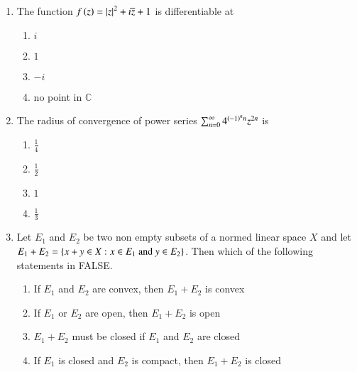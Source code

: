 \documentclass[journal]{IEEEtran}
\begin{document}
\begin{enumerate}
{\begin{figure}[H]
\label{fig:my_label}
\end{figure}
 On average it rains more in July than in December\\
 Every year, the amount of rainfall in August is more than that in January\\
 July rainfall can be estimated with better confidence than February rainfall\\
 In August, there is at least $500$mm of rainfall\\

\begin{multicols}{4}
\begin{enumerate}
\item {} and 
\item {} and 
\item {} and  
\item {} and 
\end{enumerate}
\end{multicols}
}
\item{
The function $f\left(z\right)=\left\vert z\right\vert^2+i\overline{z}+1$ is differentiable at  
\begin{multicols}{4}
\begin{enumerate}
\item $i$
\item $1$
\item $-i$
\item no point in $\mathbb{C}$
\end{enumerate}
\end{multicols}
}
\item{
The radius of convergence of power series $\sum_{n=0}^{\infty}4^{\left(-1\right)^nn}z^{2n}$ is 
\begin{multicols}{4}
\begin{enumerate}
\item $\frac{1}{4}$
\item $\frac{1}{2}$
\item $1$
\item $\frac{1}{3}$
\end{enumerate}
\end{multicols}
}
\item{
Let $E_1$ and $E_2$ be two non empty subsets of a normed linear space $X$ and let $E_1+E_2=\left\{x+y\in X:x\in E_1\text{ and }y\in E_2\right\}$. Then which of the following statements in FALSE.
\begin{enumerate}
    \item If $E_1$ and $E_2$ are convex, then $E_1+E_2$ is convex
    \item If $E_1$ or $E_2$ are open, then $E_1+E_2$ is open
    \item $E_1+E_2$ must be closed if $E_1$ and $E_2$ are closed
    \item If $E_1$ is closed and $E_2$ is compact, then $E_1+E_2$ is closed
\end{enumerate}
}
\end{enumerate}
\end{document}
